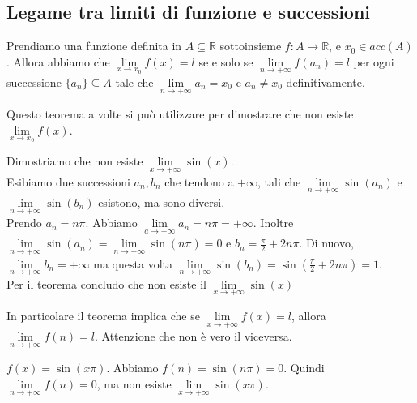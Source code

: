 \subsection{Legame tra limiti di funzione e successioni}
\begin{theorem}
Prendiamo una funzione definita in $A \subseteq \mathbb{R}$ sottoinsieme $f:A \to \mathbb{R}$, e $x_0 \in acc(A)$. Allora abbiamo che $\lim\limits_{x\to x_0}f(x) = l$ se e solo se $\lim\limits_{n\to +\infty}f(a_n) = l$ per ogni successione $\{a_n\}\subseteq A$ tale che $\lim\limits_{n\to +\infty}a_n = x_0$ e $a_n \neq x_0$ definitivamente.
\end{theorem}

\hspace{-15pt}Questo teorema a volte si può utilizzare per dimostrare che non esiste $\lim\limits_{x\to x_0}f(x)$.
\begin{example}
Dimostriamo che non esiste $\lim\limits_{x\to +\infty}\sin(x)$.\\
Esibiamo due successioni $a_n, b_n$ che tendono a $+\infty$,  tali che $\lim\limits_{n\to +\infty}\sin(a_n)$ e $\lim\limits_{n\to +\infty}\sin(b_n)$ esistono, ma sono diversi. \\
Prendo $a_n = n\pi$. Abbiamo $\lim\limits_{a\to +\infty}a_n = n\pi = +\infty$. Inoltre $\lim\limits_{n\to +\infty}\sin(a_n)= \lim\limits_{n\to +\infty}\sin(n\pi) = 0$ e $b_n = \frac{\pi}{2} + 2n\pi$. Di nuovo, $\lim\limits_{n\to +\infty}b_n = +\infty$ ma questa volta $\lim\limits_{n\to +\infty}\sin(b_n) = \sin(\frac{\pi}{2} + 2n\pi) = 1$.\\
Per il teorema concludo che non esiste il $\lim\limits_{x \to +\infty}\sin(x)$
\end{example}

\hspace{-15pt}In particolare il teorema implica che se $\lim\limits_{x\to +\infty}f(x) = l$, allora $\lim\limits_{n\to +\infty}f(n) = l$. Attenzione che non è vero il viceversa.
\begin{example}
$f(x) = \sin(x\pi)$. Abbiamo $f(n) = \sin(n\pi) = 0$. Quindi $\lim\limits_{n\to +\infty}f(n) = 0$, ma non esiste $\lim\limits_{x\to +\infty}\sin(x\pi)$.
\end{example}